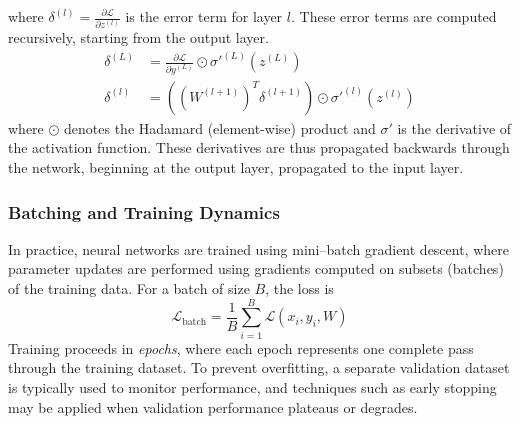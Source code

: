             where \(\delta^{(l)} = \frac{\partial \mathcal{L}}{\partial z^{(l)}}\) is the error term for layer \(l\).
            These error terms are computed recursively, starting from the output layer.
            \begin{align}
                \delta^{(L)} &= \frac{\partial \mathcal{L}}{\partial y^{(L)}} \odot \sigma'^{(L)}(z^{(L)}) \\
                \delta^{(l)} &= ((W^{(l+1)})^T \delta^{(l+1)}) \odot \sigma'^{(l)}(z^{(l)})
            \end{align}
            where \(\odot\) denotes the Hadamard (element-wise) product and \(\sigma'\) is the derivative of the activation function.
            These derivatives are thus propagated backwards through the network, beginning at the output layer, propagated to the input layer.

        
        \subsubsection{Batching and Training Dynamics}
            In practice, neural networks are trained using mini--batch gradient descent, where parameter updates are performed using gradients computed on subsets (batches) of the training data. For a batch of size \(B\), the loss is
            \begin{equation}
                \mathcal{L}_{\text{batch}} = \frac{1}{B}\sum_{i=1}^B\mathcal{L}(x_i, y_i, W)
            \end{equation}
            Training proceeds in \emph{epochs}, where each epoch represents one complete pass through the training dataset.
            To prevent overfitting, a separate validation dataset is typically used to monitor performance, and techniques such as early stopping may be applied when validation performance plateaus or degrades.
